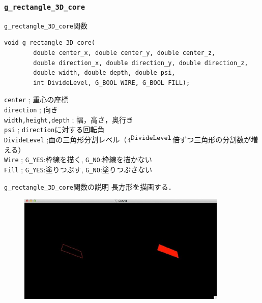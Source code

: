 \documentclass[platex,a4paper,12pt]{jsarticle}%
\begin{document}


\clearpage
\subsubsection{\texttt{g\_rectangle\_3D\_core}}

\begin{itembox}[l]{\texttt{g\_rectangle\_3D\_core}関数}
\begin{verbatim}
void g_rectangle_3D_core(
        double center_x, double center_y, double center_z,
        double direction_x, double direction_y, double direction_z,
        double width, double depth, double psi,
        int DivideLevel, G_BOOL WIRE, G_BOOL FILL);
\end{verbatim}
\verb|center| ; 重心の座標\\
\verb|direction| ; 向き\\
\verb|width,height,depth| ; 幅，高さ，奥行き\\
\verb|psi| ; \verb|direction|に対する回転角\\
\verb|DivideLevel| ;面の三角形分割レベル（$4^{\verb|DivideLevel|}$倍ずつ三角形の分割数が増える）\\
\verb|Wire| ; \verb|G_YES|:枠線を描く, \verb|G_NO|:枠線を描かない \\
\verb|Fill| ; \verb|G_YES|:塗りつぶす, \verb|G_NO|:塗りつぶさない 
\end{itembox}

\begin{itembox}[l]{\texttt{g\_rectangle\_3D\_core}関数の説明}
長方形を描画する．
\end{itembox}

\begin{figure}[htb]
	\includegraphics[width=100mm]{./Figures/eps/Canvas_g_rectangle.eps}
\end{figure}
\end{document}
